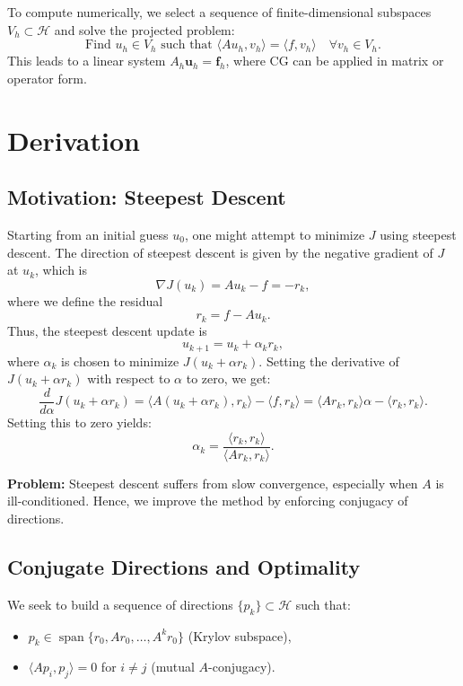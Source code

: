 \documentclass[12pt]{article}
\begin{document}
To compute numerically, we select a sequence of finite-dimensional subspaces \( V_h \subset \mathcal{H} \) and solve the projected problem:
\[
\text{Find } u_h \in V_h \text{ such that } \langle A u_h, v_h \rangle = \langle f, v_h \rangle \quad \forall v_h \in V_h.
\]
This leads to a linear system \( A_h \mathbf{u}_h = \mathbf{f}_h \), where CG can be applied in matrix or operator form.

\section{Derivation}

\subsection{Motivation: Steepest Descent}

Starting from an initial guess \( u_0 \), one might attempt to minimize \( J \) using steepest descent. The direction of steepest descent is given by the negative gradient of \( J \) at \( u_k \), which is
\[
\nabla J(u_k) = A u_k - f = -r_k,
\]
where we define the residual
\[
r_k = f - A u_k.
\]
Thus, the steepest descent update is
\[
u_{k+1} = u_k + \alpha_k r_k,
\]
where \( \alpha_k \) is chosen to minimize \( J(u_k + \alpha r_k) \). Setting the derivative of \( J(u_k + \alpha r_k) \) with respect to \( \alpha \) to zero, we get:
\[
\frac{d}{d\alpha} J(u_k + \alpha r_k) = \langle A(u_k + \alpha r_k), r_k \rangle - \langle f, r_k \rangle = \langle A r_k, r_k \rangle \alpha - \langle r_k, r_k \rangle.
\]
Setting this to zero yields:
\[
\alpha_k = \frac{\langle r_k, r_k \rangle}{\langle A r_k, r_k \rangle}.
\]

\textbf{Problem:} Steepest descent suffers from slow convergence, especially when \( A \) is ill-conditioned. Hence, we improve the method by enforcing conjugacy of directions.

\subsection{Conjugate Directions and Optimality}

We seek to build a sequence of directions \( \{p_k\} \subset \mathcal{H} \) such that:

\begin{itemize}
    \item \( p_k \in \operatorname{span}\{r_0, A r_0, \dots, A^{k} r_0\} \) (Krylov subspace),
    \item \( \langle A p_i, p_j \rangle = 0 \) for \( i \neq j \) (mutual \( A \)-conjugacy).
\end{itemize}
\end{document}
